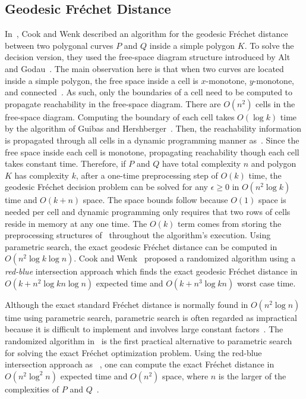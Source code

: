 \documentclass[12pt]{dalthesis}
\newcommand{\Frechet}{Fr\'echet }
\begin{document}
\subsection{Geodesic \Frechet Distance}
In~\cite{WenkC08a}, Cook and Wenk  described an algorithm for the geodesic
\Frechet distance between two polygonal curves $P$ and $Q$ 
inside a simple polygon $K$. 
To solve the decision version, they used the free-space diagram 
structure introduced by Alt and Godau~\cite{AltG95}. 
The main observation here is that when two curves are located inside a 
simple polygon, the free space inside a cell is $x$-monotone, $y$-monotone, 
and connected~\cite{WenkC08a}. As such, only the boundaries of 
a cell need to be computed to propagate reachability 
in the free-space diagram.
There are $O(n^2)$ cells in the free-space diagram. 
Computing the boundary of each cell takes $O(\log k)$ time by the algorithm of Guibas 
and Hershberger~\cite{Guibas86}. 
Then, the reachability information is 
propagated through all cells in a dynamic programming manner as~\cite{AltG95}. 
Since the free space inside each cell is monotone, 
propagating reachability though each cell takes constant time. Therefore, 
if $P$ and $Q$ have total complexity $n$ and polygon $K$ has complexity $k$, 
after a one-time preprocessing step of $O(k)$ time, the geodesic \Frechet decision
problem can be solved for
any $\epsilon\ge 0 $  in $O(n^2 \log k)$ time and $O(k + n)$ space.
The space bounds follow because $O(1)$ space is needed per cell
and dynamic programming only requires that two rows of cells reside
in memory at any one time. The $O(k)$ term comes from storing the
preprocessing structures of~\cite{Guibas86} throughout the algorithm's execution.
Using parametric search, the exact 
geodesic \Frechet distance can be computed in 
$O(n^2 \log k \log n)$. 
Cook and Wenk~\cite{WenkC08a} proposed a randomized algorithm using 
a {\em red-blue } intersection approach which  
finds the exact geodesic \Frechet distance in 
$O(k + n^2 \log kn \log n)$ expected time and $O(k +n^3 \log kn)$ worst case
time.




Although the exact standard \Frechet distance is normally found in
$O(n^2 \log n)$ time using parametric search, parametric search
is often regarded as impractical because it is difficult to implement and
involves large constant factors~\cite{Cole87}. 
The randomized algorithm in~\cite{WenkC08a} 
is the first practical alternative to parametric search
for solving the exact \Frechet optimization problem.
Using the red-blue intersection approach as ~\cite{WenkC08a}, 
one can compute the exact \Frechet distance in $O(n^2 \log^2 n)$ expected
time and $O(n^2)$ space, where $n$ is the larger of the complexities of $P$
and $Q$~\cite{WenkC08a}.
\end{document}

